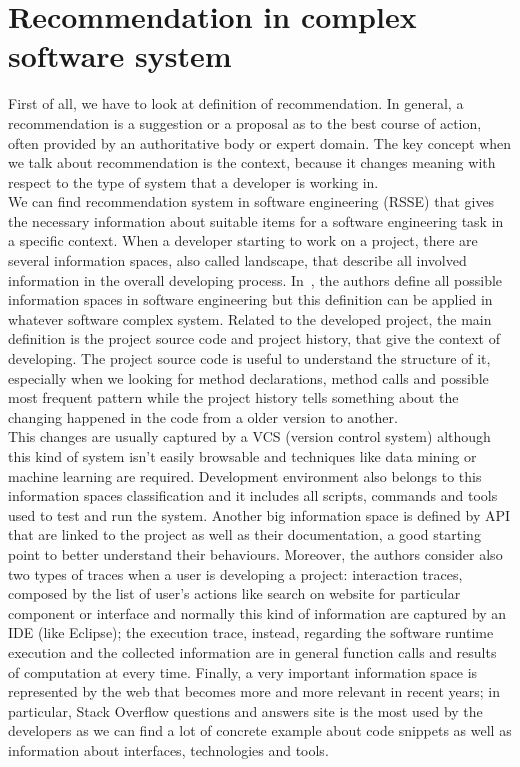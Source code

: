 \section{Recommendation in complex software system}
First of all, we have to look at definition of recommendation.  In general, a recommendation is a suggestion or a proposal as to the best course of action, often provided by an authoritative body or expert domain. The key concept when we talk about recommendation is the context, because it changes meaning with respect to the type of system that a developer is working in. \\
We can find recommendation system in software engineering (RSSE) that gives the necessary information about suitable items for a software engineering task in a specific context. When a developer starting to work on a project, there are several information spaces, also called landscape, that describe all involved information in the overall developing process. In~\cite{martin_p.robillard_introduction_2009}, the authors define all possible information spaces in software engineering but this definition can be applied in whatever software complex system. Related to the developed project, the main definition is the project source code and project history, that give the context of developing. The project source code is useful to understand the structure of it, especially when we looking for method declarations, method calls and possible most frequent pattern while the project history tells something about the changing happened in the code from a older version to another. \\
This changes are usually captured by a VCS (version control system) although this kind of system isn't easily browsable and techniques like data mining or machine learning are required. Development environment also belongs to this information spaces classification and it includes all scripts, commands and tools used to test and run the system. Another big information space is defined by API that are linked to the project as well as their documentation, a good starting point to better understand their behaviours. Moreover, the authors consider also two types of traces when a user is developing a project: interaction traces, composed by the list of user's actions like search on website for particular component or interface and normally this kind of information are captured by an IDE (like Eclipse); the execution trace, instead, regarding the software runtime execution and the collected information are in general function calls and results of computation at every time. Finally, a very important information space is represented by the web that becomes more and more relevant in recent years; in particular, Stack Overflow questions and answers site is the most used by the developers as we can find a lot of concrete example about code snippets as well as information about interfaces, technologies and tools. \\
